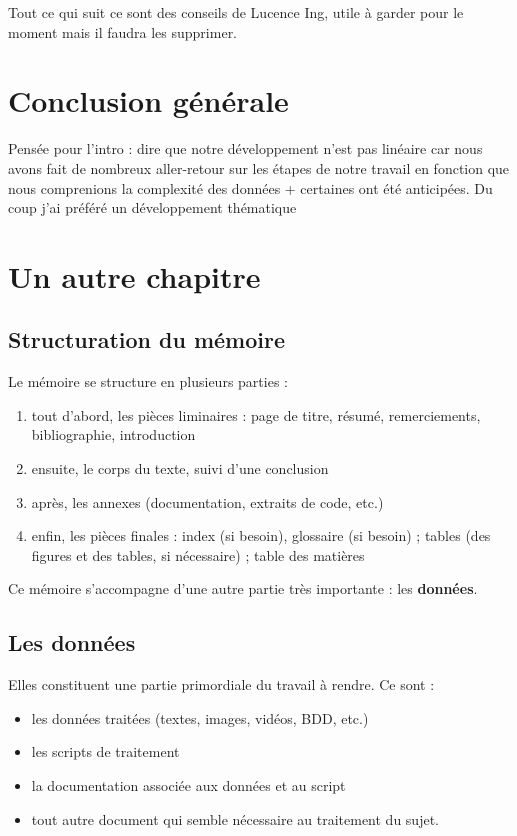 \documentclass[a4paper,12pt,twoside]{book}
\begin{document}
	Tout ce qui suit ce sont des conseils de Lucence Ing, utile à garder pour le moment mais il faudra les supprimer.
	
	\chapter*{Conclusion générale}
	
	Pensée pour l'intro : dire que notre développement n'est pas linéaire car nous avons fait de nombreux aller-retour sur les étapes de notre travail en fonction que nous comprenions la complexité des données + certaines ont été anticipées. Du coup j'ai préféré un développement thématique
	
	\chapter{Un autre chapitre}
	
	\section{Structuration du mémoire}
	
	Le mémoire se structure en plusieurs parties :
	\begin{enumerate}
		\item tout d'abord, les pièces liminaires : page de titre, résumé, remerciements, bibliographie, introduction
		\item ensuite, le corps du texte, suivi d'une conclusion
		\item après, les annexes (documentation, extraits de code, etc.)
		\item enfin, les pièces finales : index (si besoin), glossaire (si besoin) ; tables (des figures et des tables, si nécessaire) ; table des matières
	\end{enumerate}
	
	Ce mémoire s'accompagne d'une autre partie très importante : les \textbf{données}.
	
	\section{Les données}
	
	Elles constituent une partie primordiale du travail à rendre. Ce sont :
	\begin{itemize}
		\item les données traitées (textes, images, vidéos, BDD, etc.)
		\item les scripts de traitement
		\item la documentation associée aux données et au script
		\item tout autre document qui semble nécessaire au traitement du sujet.
	\end{itemize}
	
\end{document}
